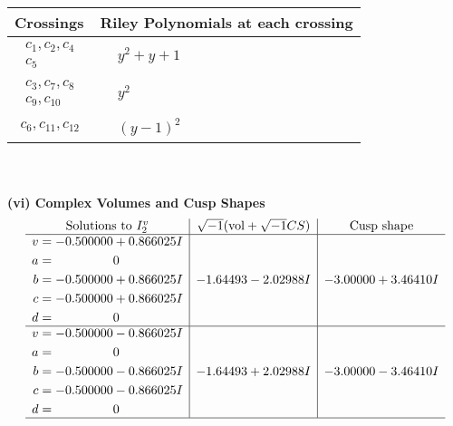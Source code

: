 \documentclass[1p]{elsarticle_modified}
\theoremstyle{definition}
\newcommand{\I}{\sqrt{-1}}
\begin{document}
\begin{tabular}{m{50pt}|m{274pt}}
Crossings & \hspace{64pt}Riley Polynomials at each crossing \\
\hline $$\begin{aligned}c_{1},c_{2},c_{4}\\c_{5}\end{aligned}$$&$\begin{aligned}
&y^2+y+1
\end{aligned}$\\
\hline $$\begin{aligned}c_{3},c_{7},c_{8}\\c_{9},c_{10}\end{aligned}$$&$\begin{aligned}
&y^2
\end{aligned}$\\
\hline $$\begin{aligned}c_{6},c_{11},c_{12}\end{aligned}$$&$\begin{aligned}
&(y-1)^2
\end{aligned}$\\
\hline
\end{tabular}\\~\\
\newpage\flushleft \textbf{(vi) Complex Volumes and Cusp Shapes}
$$\begin{array}{c|c|c}  
\text{Solutions to }I^v_{2}& \I (\text{vol} + \sqrt{-1}CS) & \text{Cusp shape}\\
 \hline 
\begin{aligned}
v &= -0.500000 + 0.866025 I \\
a &= \phantom{-0.000000 } 0 \\
b &= -0.500000 + 0.866025 I \\
c &= -0.500000 + 0.866025 I \\
d &= \phantom{-0.000000 } 0\end{aligned}
 & -1.64493 - 2.02988 I & -3.00000 + 3.46410 I \\ \hline\begin{aligned}
v &= -0.500000 - 0.866025 I \\
a &= \phantom{-0.000000 } 0 \\
b &= -0.500000 - 0.866025 I \\
c &= -0.500000 - 0.866025 I \\
d &= \phantom{-0.000000 } 0\end{aligned}
 & -1.64493 + 2.02988 I & -3.00000 - 3.46410 I\\
 \hline 
 \end{array}$$\newpage\newpage\renewcommand{\arraystretch}{1}
\end{document}
